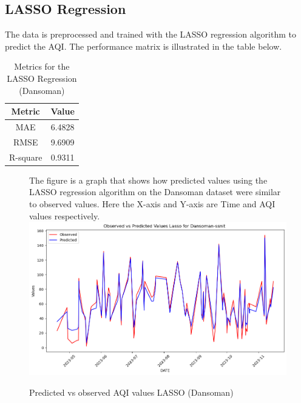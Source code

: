 \documentclass{book}
\numberwithin{equation}{section}
\numberwithin{figure}{section}
\begin{document}
 \subsection{LASSO Regression}
 \vspace{-5mm} %
The data is preprocessed and trained with the LASSO regression algorithm to predict the AQI. The performance matrix is illustrated in the table below.
\begin{table}[H]
    \centering
    \begin{tabular}{|c|c|}
        \hline
        \textbf{Metric} & \textbf{Value} \\
        \hline
        MAE & 6.4828 \\
        \hline
        RMSE & 9.6909 \\
        \hline
        R-square & 0.9311 \\
        \hline
    \end{tabular}
    \caption{Metrics for the LASSO Regression (Dansoman)}
    \label{tab: LASSO metrics (Dansoman)}
\end{table}
\begin{figure}[H]
 \begin{minipage}{\linewidth}
        The figure is a graph that shows how predicted values using the LASSO regression algorithm on the Dansoman dataset were similar to observed values. Here the X-axis and Y-axis are Time and AQI values respectively.
        \vspace{0.5em} 
        \includegraphics[width=\linewidth]{LASSO line plot.png}
       \caption{ Predicted vs observed AQI values LASSO (Dansoman)}
        \label{fig: LASSO Predicted vs observed AQI(Dansoman)}
    \end{minipage}
\end{figure}
\vspace{-5mm} %
\end{document}
